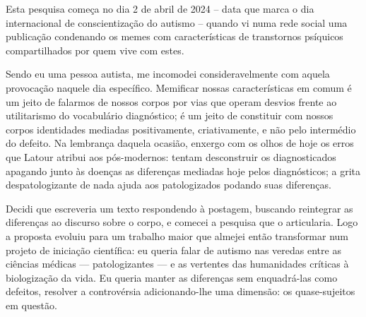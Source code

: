 

Esta pesquisa começa no dia 2 de abril de 2024 -- data que marca o dia internacional de conscientização do autismo -- quando vi  numa rede social uma publicação condenando os memes com características de transtornos psíquicos compartilhados por quem vive com estes.

Sendo eu uma pessoa autista, me incomodei consideravelmente com aquela provocação naquele dia específico. Memificar nossas características em comum é um jeito de falarmos de nossos corpos por vias que operam desvios frente ao utilitarismo do vocabulário diagnóstico; é um jeito de constituir com nossos corpos identidades mediadas positivamente, criativamente, e não pelo intermédio do defeito. Na lembrança daquela ocasião, enxergo com os olhos de hoje os erros que Latour atribui aos pós-modernos: tentam desconstruir os diagnosticados apagando junto às doenças as diferenças mediadas hoje pelos diagnósticos; a grita despatologizante de nada ajuda aos patologizados podando suas diferenças.

Decidi que escreveria um texto respondendo à postagem, buscando reintegrar as diferenças ao discurso sobre o corpo, e comecei a pesquisa que o articularia. Logo a proposta evoluiu para um trabalho maior que almejei então transformar num projeto de iniciação científica: eu queria falar de autismo nas veredas entre as ciências médicas --- patologizantes --- e as vertentes das humanidades críticas à biologização da vida. Eu queria manter as diferenças sem enquadrá-las como defeitos, resolver a controvérsia adicionando-lhe uma dimensão: os quase-sujeitos em questão.

